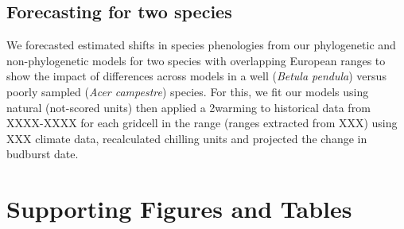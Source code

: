 \documentclass[11pt]{article}
\begin{document}
\subsection{Forecasting for two species}
We forecasted estimated shifts in species phenologies from our phylogenetic and non-phylogenetic models for two species with overlapping European ranges to show the impact of differences across models in a well (\emph{Betula pendula}) versus poorly sampled  (\emph{Acer campestre}) species. For this, we fit our models using natural (not-scored units) then applied a 2\degree warming to historical data from XXXX-XXXX for each gridcell in the range (ranges extracted from XXX) using XXX climate data, recalculated chilling units and projected the change in budburst date. 

\clearpage







\clearpage
\section*{Supporting Figures and Tables}
\end{document}

